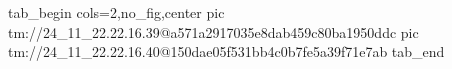  
 
 
 
 

\qqSecOrig


\ifcmt
  tab_begin cols=2,no_fig,center
    pic tm://24_11_22.22.16.39@a571a2917035e8dab459c80ba1950ddc
    pic tm://24_11_22.22.16.40@150dae05f531bb4c0b7fe5a39f71e7ab
  tab_end
\fi

